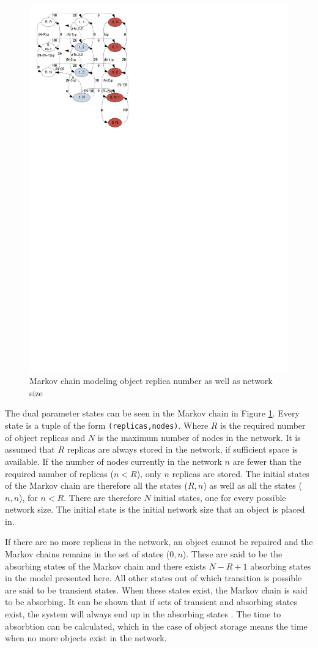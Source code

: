 \documentclass[10pt,a4paper,conference]{IEEEtran}
\begin{document}
\begin{figure}[htbp]
 \centering
 \includegraphics[clip=true, viewport=0.5cm 19.5cm 8.5cm 29.5cm, width=0.7\columnwidth]{Markov_chain_repair_compact}
 \caption{Markov chain modeling object replica number as well as network size}
 \label{fig_markov_chain}
\end{figure}


The dual parameter states can be seen in the Markov chain in Figure \ref{fig_markov_chain}. Every state is a tuple of the form \verb.(replicas,nodes).. Where $R$ is the required number of object replicas and $N$ is the maximum number of nodes in the network. It is assumed that $R$ replicas are always stored in the network, if sufficient space is available. If the number of nodes currently in the network $n$ are fewer than the required number of replicas ($n < R$), only $n$ replicas are stored. The initial states of the Markov chain are therefore all the states ($R,n$) as well as all the states ($n,n$), for $n < R$. There are therefore $N$ initial states, one for every possible network size. The initial state is the initial network size that an object is placed in.

If there are no more replicas in the network, an object cannot be repaired and the Markov chains remains in the set of states ($0,n$). These are said to be the absorbing states of the Markov chain and there exists $N - R + 1$ absorbing states in the model presented here. All other states out of which transition is possible are said to be transient states. When these states exist, the Markov chain is said to be absorbing. It can be shown that if sets of transient and absorbing states exist, the system will always end up in the absorbing states \cite{grinstead1997introduction_probability}. The time to absorbtion can be calculated, which in the case of object storage means the time when no more objects exist in the network.
\end{document}
